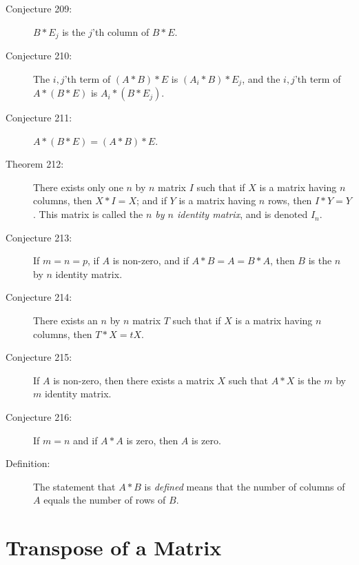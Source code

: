 \documentclass{article}
\begin{document}
\begin{description}
  \item[Conjecture 209:] $B*E_{j}$ is the $j$'th column of $B*E$.

  \item[Conjecture 210:] The $i,j$'th term of $(A*B)*E$ is $(A_{i}*B)*E_{j}$, and the $i,j$'th term of $A*(B*E)$ is $A_{i}*(B*E_{j})$.

  \item[Conjecture 211:] $A*(B*E)=(A*B)*E$.

  \item[Theorem 212:] There exists only one $n$ by $n$ matrix $I$ such that if $X$ is a matrix having $n$ columns, then $X*I=X$; and if $Y$ is a matrix having $n$ rows, then $I*Y=Y$. This matrix is called the \emph{$n$ by $n$ identity matrix}, and is denoted $I_{n}$.

  \item[Conjecture 213:] If $m=n=p$, if $A$ is non-zero, and if $A*B=A=B*A$, then $B$ is the $n$ by $n$ identity matrix.

  \item[Conjecture 214:] There exists an $n$ by $n$ matrix $T$ such that if $X$ is a matrix having $n$ columns, then $T*X=tX$.

  \item[Conjecture 215:] If $A$ is non-zero, then there exists a matrix $X$ such that $A*X$ is the $m$ by $m$ identity matrix.

  \item[Conjecture 216:] If $m=n$ and if $A*A$ is zero, then $A$ is zero.

  \item[Definition:] The statement that $A*B$ is \emph{defined} means that the number of columns of $A$ equals the number of rows of $B$.

\end{description}


\section{Transpose of a Matrix}
\end{document}

